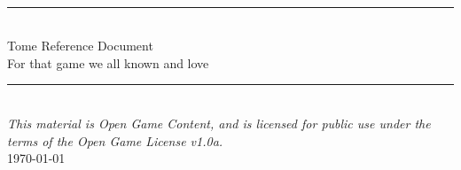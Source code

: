 \documentclass[10pt,oneside,onecolumn,openany,final]{memoir}
\makeatletter
\renewcommand{\@makechapterhead}[1]{%
\vspace*{0 pt}{%
\raggedright \normalfont \fontsize{32}{32} \selectfont \bfseries%
\ifnum \value{secnumdepth}>-1%
  \if@mainmatter \vspace{-8pt} {\fontsize{20}{20} \selectfont Chapter \thechapter:}\\[8pt]%
  \fi%
\fi
\hspace{0.65cm} #1\par\nobreak\vspace{20 pt}%
}}
\newcounter{counter}
\makeatother
\begin{document}
\thispagestyle{empty}
\begin{center}
\textsc{\Large}\\[0.25cm]
\rule{\linewidth}{0.5mm} \\[0.70cm]
\fontsize{30}{30} \selectfont Tome Reference Document\\[.30cm]
\fontsize{16}{18} \selectfont \guillemotleft{} For that game we all known and love \guillemotright{}\\
\rule{\linewidth}{0.5mm} \\[0.6cm]
\vfill
{\large \textit{This material is Open Game Content, and is licensed for public use under the terms of the Open Game License v1.0a.}\\
\today}
\end{center}

\pagebreak
\sffamily
\pagestyle{plain}
\raggedbottom

\renewcommand{\contentsname}{Table of Contents}
\setcounter{tocdepth}{1}
\tableofcontents



\clearpage














\appendix
\appendixpage

\makeatletter
\renewcommand{\@makechapterhead}[1]{%
\vspace*{0 pt}{
\raggedright \normalfont \fontsize{32}{32} \selectfont \bfseries
\ifnum \value{secnumdepth}>-1
  \if@mainmatter \vspace{-8pt} {\fontsize{20}{20} \selectfont Appendix \thechapter:}\\[8pt]
  \fi%
\fi
\hspace{0.65cm} #1\par\nobreak\vspace{20 pt}
}}
\makeatother
\end{document}
